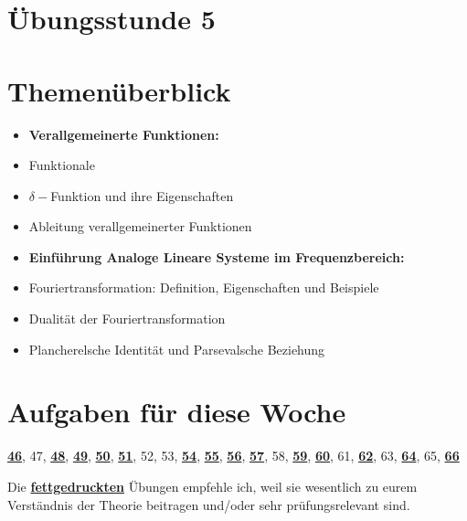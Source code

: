 \documentclass[11pt]{article}
\begin{document}
\thispagestyle{firstpage}

\setlength{\headheight}{1 \baselineskip}  %
\setlength{\parindent}{0pt}  %
\setlength{\parskip}{\baselineskip}  %

\vspace*{-5px}
\section*{Übungsstunde 5}

\section*{Themenüberblick}
\begin{itemize}
    \item \textbf{Verallgemeinerte Funktionen:}
    \item[] Funktionale
    \item[] $\delta-$Funktion und ihre Eigenschaften
    \item[] Ableitung verallgemeinerter Funktionen
    \item \textbf{Einführung Analoge Lineare Systeme im Frequenzbereich:}
    \item[] Fouriertransformation: Definition, Eigenschaften und Beispiele
    \item[] Dualität der Fouriertransformation
    \item[] Plancherelsche Identität und Parsevalsche Beziehung
\end{itemize}

\section*{Aufgaben für diese Woche}
\vspace{-0.5cm}

\underline{\textbf{46}}, 47, \underline{\textbf{48}}, \underline{\textbf{49}}, \underline{\textbf{50}}, \underline{\textbf{51}}, 52, 53, \underline{\textbf{54}}, \underline{\textbf{55}}, \underline{\textbf{56}}, \underline{\textbf{57}}, 58, \underline{\textbf{59}}, \underline{\textbf{60}}, 61, \underline{\textbf{62}}, 63, \underline{\textbf{64}}, 65, \underline{\textbf{66}}\\
\vspace{-0.5cm}

Die \underline{\textbf{fettgedruckten}} Übungen empfehle ich, weil sie wesentlich zu eurem Verständnis der Theorie beitragen und/oder sehr prüfungsrelevant sind.
\end{document}
